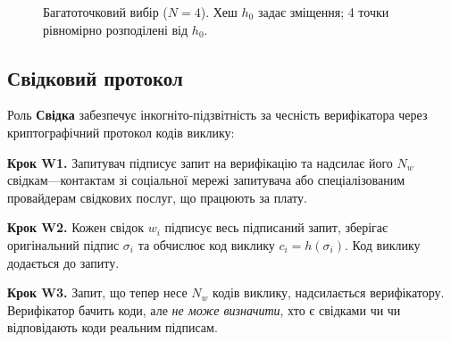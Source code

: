 \documentclass[11pt,a4paper,twocolumn]{article}
\begin{document}
\begin{figure}[ht]
\centering
{}
\caption{Багатоточковий вибір ($N{=}4$). Хеш $h_0$ задає зміщення; 4 точки рівномірно розподілені від $h_0$.}
\label{fig:multipoint}
\end{figure}

\subsection{Свідковий протокол}

Роль \textbf{Свідка} забезпечує інкогніто-підзвітність за чесність верифікатора через криптографічний протокол кодів виклику:

\textbf{Крок W1.} Запитувач підписує запит на верифікацію та надсилає його $N_w$ свідкам---контактам зі соціальної мережі запитувача або спеціалізованим провайдерам свідкових послуг, що працюють за плату.

\textbf{Крок W2.} Кожен свідок $w_i$ підписує весь підписаний запит, зберігає оригінальний підпис $\sigma_i$ та обчислює код виклику $c_i = h(\sigma_i)$. Код виклику додається до запиту.

\textbf{Крок W3.} Запит, що тепер несе $N_w$ кодів виклику, надсилається верифікатору. Верифікатор бачить коди, але \emph{не може визначити}, хто є свідками чи чи відповідають коди реальним підписам.
\end{document}
